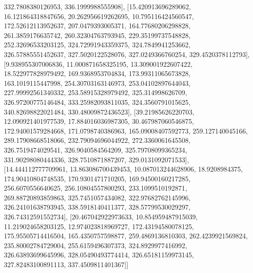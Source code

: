 332.7808380126953, 336.1999988555908], [15.420913696289062, 16.121864318847656, 20.262956619262695, 10.795116424560547, 172.52612113952637, 207.0479393005371, 164.77680206298828, 261.3859176635742, 260.32304763793945, 229.35199737548828, 252.32696533203125, 324.72991943359375, 324.7849941253662, 326.57885551452637, 327.5020122528076, 327.0249366760254, 329.4520378112793], [9.938955307006836, 11.000871658325195, 13.309001922607422, 18.522977828979492, 169.9368953704834, 173.99311065673828, 163.1019115447998, 254.30703163146973, 253.04102897644043, 227.99992561340332, 253.58915328979492, 325.314998626709, 326.97200775146484, 333.25982093811035, 324.3560791015625, 340.82698822021484, 330.48009872436523], [39.21985626220703, 12.090921401977539, 17.884016036987305, 30.467987060546875, 172.94001579284668, 171.0798740386963, 165.09008407592773, 259.127140045166, 289.17908668518066, 232.79094696044922, 272.3360061645508, 326.7519474029541, 326.9040584564209, 325.79708099365234, 331.90298080444336, 328.7510871887207, 329.0131092071533], [14.444112777709961, 13.863086700439453, 10.087013244628906, 18.9208984375, 174.90410804748535, 170.9301471710205, 169.94500160217285, 256.6070556640625, 256.10804557800293, 233.1099510192871, 269.88720893859863, 325.7451057434082, 322.97682762145996, 326.24101638793945, 338.5918140411377, 328.57799530029297, 326.74312591552734], [20.467042922973633, 10.854959487915039, 11.219024658203125, 12.974023818969727, 172.43194580078125, 175.95505714416504, 165.4350757598877, 259.4869136810303, 262.4239921569824, 235.80002784729004, 255.6159496307373, 324.8929977416992, 326.63893699645996, 328.05490493774414, 326.65181159973145, 327.82483100891113, 337.4509811401367]]
%
%
%
%
%
%

